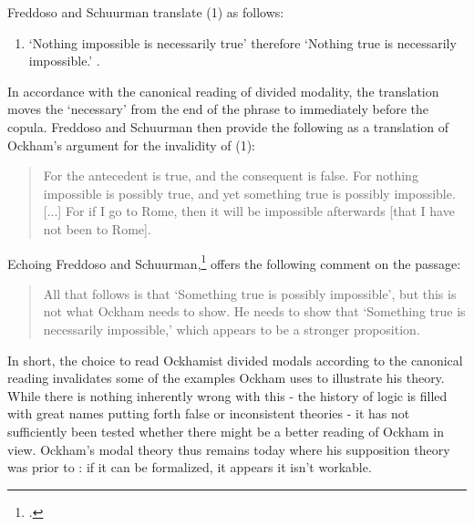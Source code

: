 \documentclass[]{article}
\begin{document}
\noindent Freddoso and Schuurman translate (1) as follows:
\begin{enumerate}
	\item[(1')]	`Nothing impossible is necessarily true' therefore `Nothing true is necessarily impossible.' \cite[p. 166]{OckhamSLEng}.
\end{enumerate}

\noindent In accordance with the canonical reading of divided modality, the translation moves the `necessary' from the end of the phrase to immediately before the copula. Freddoso and Schuurman then provide the following as a translation of Ockham's argument for the invalidity of (1):
\begin{quote}
	For the antecedent is true, and the consequent is false. For nothing impossible is possibly true, and yet something true is possibly impossible. [...] For if I go to Rome, then it will be impossible afterwards [that I have not been to Rome]. \cite[p. 166]{OckhamSLEng}
\end{quote}

Echoing Freddoso and Schuurman,\footnote{\cite[p. 203, fn. 4]{OckhamSLEng}.} \cite{Johnston2015} offers the following comment on the passage: 

\begin{quote}
	All that follows is that `Something true is possibly impossible', but this is not what Ockham needs to show. He needs to show that `Something true is necessarily impossible,' which appears to be a stronger proposition.  \cite[p. 243]{Johnston2015}
\end{quote}

In short, the choice to read Ockhamist divided modals according to the canonical reading invalidates some of the examples Ockham uses to illustrate his theory. While there is nothing inherently wrong with this - the history of logic is filled with great names putting forth false or inconsistent theories - it has not sufficiently been tested whether there might be a better reading of Ockham in view. Ockham's modal theory thus remains today where his supposition theory was prior to \cite{PriestRead1977}: if it can be formalized, it appears it isn't workable.
\end{document}
